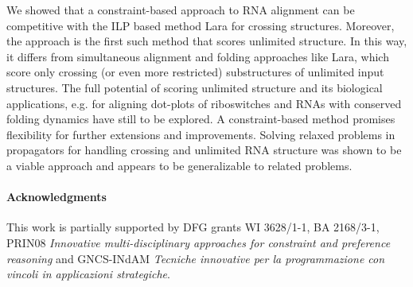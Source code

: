 \documentclass{easychair}
\begin{document}
We showed that a constraint-based approach to RNA alignment can be
competitive with the ILP based method Lara for crossing
structures. Moreover, the approach is the first such method that
scores unlimited structure. In this way, it differs from simultaneous
alignment and folding approaches like Lara, which score only crossing
(or even more restricted) substructures of unlimited input
structures. The full potential of scoring unlimited structure and its
biological applications, e.g. for aligning dot-plots of riboswitches
and RNAs with conserved folding dynamics have still to be explored. A
constraint-based method promises flexibility for further extensions
and improvements. Solving relaxed problems in propagators for handling
crossing and unlimited RNA structure was shown to be a viable approach
and appears to be generalizable to related problems.

\paragraph{Acknowledgments} This work is partially supported by DFG grants WI 3628/1-1, BA 2168/3-1, PRIN08 \emph{Innovative multi-disciplinary approaches
for constraint and preference reasoning} and GNCS-INdAM \emph{Tecniche innovative per la programmazione con vincoli in applicazioni strategiche}.



\end{document}
